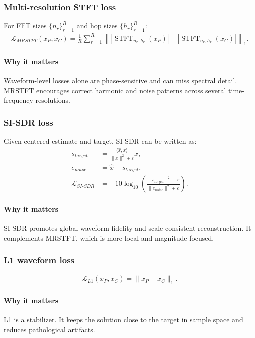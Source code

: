 \documentclass[11pt]{article}
\begin{document}
\subsubsection{Multi-resolution STFT loss}
For FFT sizes $\{n_r\}_{r=1}^{R}$ and hop sizes $\{h_r\}_{r=1}^{R}$:
\begin{align}
    \mathcal{L}_{MRSTFT}(x_P, x_C)
    = \frac{1}{R}\sum_{r=1}^{R}
    \left\|\left|\operatorname{STFT}_{n_r,h_r}(x_P)\right| - \left|\operatorname{STFT}_{n_r,h_r}(x_C)\right|\right\|_1.
\end{align}

\paragraph{Why it matters}
Waveform-level losses alone are phase-sensitive and can miss spectral detail. MRSTFT encourages correct harmonic and noise patterns across several time-frequency resolutions.

\subsubsection{SI-SDR loss}
Given centered estimate and target, SI-SDR can be written as:
\begin{align}
    s_{target} &= \frac{\langle \hat{x}, x \rangle}{\|x\|^2 + \varepsilon}x, \\
    e_{noise} &= \hat{x} - s_{target}, \\
    \mathcal{L}_{SI\text{-}SDR} &= -10\log_{10}\left(\frac{\|s_{target}\|^2 + \varepsilon}{\|e_{noise}\|^2 + \varepsilon}\right).
\end{align}

\paragraph{Why it matters}
SI-SDR promotes global waveform fidelity and scale-consistent reconstruction. It complements MRSTFT, which is more local and magnitude-focused.

\subsubsection{L1 waveform loss}
\begin{align}
    \mathcal{L}_{L1}(x_P, x_C) = \|x_P - x_C\|_1.
\end{align}

\paragraph{Why it matters}
L1 is a stabilizer. It keeps the solution close to the target in sample space and reduces pathological artifacts.
\end{document}
